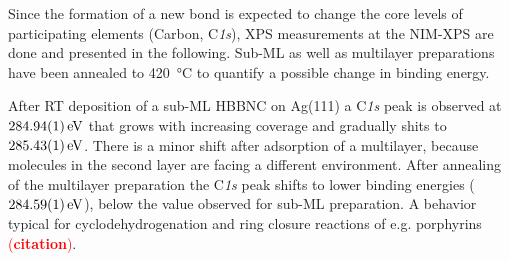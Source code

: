 %

Since the formation of a new bond is expected to change the core levels of participating elements (Carbon, C\textit{1s}), XPS measurements at the NIM-XPS are done and presented in the following. Sub-ML as well as multilayer preparations have been annealed to \SI{420}{\celsius} to quantify a possible change in binding energy. 

After RT deposition of a sub-ML HBBNC on Ag(111) a C\textit{1s} peak is observed at $\SI{284,94 \pm 0.01}{\eV}$ that grows with increasing coverage and gradually shits to $\SI{285,43 \pm 0.01}{\eV}$. There is a minor shift after adsorption of a multilayer, because molecules in the second layer are facing a different environment.
After annealing of the multilayer preparation the C\textit{1s} peak shifts to lower binding energies ($\SI{284,59 \pm 0.01}{\eV}$), below the value observed for sub-ML preparation. A behavior typical for cyclodehydrogenation and ring closure reactions of e.g. porphyrins \textcolor{red}{(\textbf{citation})}.

